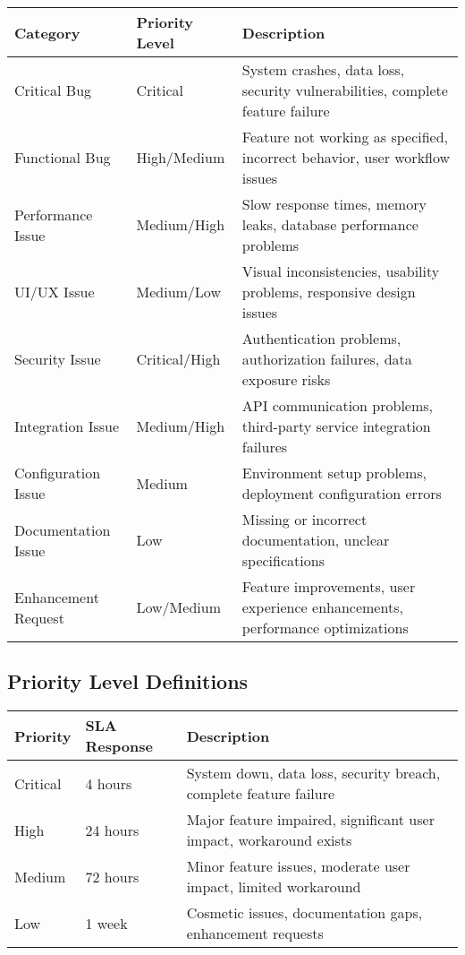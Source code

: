 \documentclass[12pt,a4paper]{article}
\begin{document}
\begin{longtable}{|p{2.5cm}|p{2.5cm}|p{7.5cm}|}
\hline
\textbf{Category} & \textbf{Priority Level} & \textbf{Description} \\
\hline
Critical Bug & Critical & System crashes, data loss, security vulnerabilities, complete feature failure \\
\hline
Functional Bug & High/Medium & Feature not working as specified, incorrect behavior, user workflow issues \\
\hline
Performance Issue & Medium/High & Slow response times, memory leaks, database performance problems \\
\hline
UI/UX Issue & Medium/Low & Visual inconsistencies, usability problems, responsive design issues \\
\hline
Security Issue & Critical/High & Authentication problems, authorization failures, data exposure risks \\
\hline
Integration Issue & Medium/High & API communication problems, third-party service integration failures \\
\hline
Configuration Issue & Medium & Environment setup problems, deployment configuration errors \\
\hline
Documentation Issue & Low & Missing or incorrect documentation, unclear specifications \\
\hline
Enhancement Request & Low/Medium & Feature improvements, user experience enhancements, performance optimizations \\
\hline
\end{longtable}

\subsection{Priority Level Definitions}

\begin{longtable}{|p{1.8cm}|p{2.5cm}|p{8.2cm}|}
\hline
\textbf{Priority} & \textbf{SLA Response} & \textbf{Description} \\
\hline
Critical & 4 hours & System down, data loss, security breach, complete feature failure \\
\hline
High & 24 hours & Major feature impaired, significant user impact, workaround exists \\
\hline
Medium & 72 hours & Minor feature issues, moderate user impact, limited workaround \\
\hline
Low & 1 week & Cosmetic issues, documentation gaps, enhancement requests \\
\hline
\end{longtable}
\end{document}

